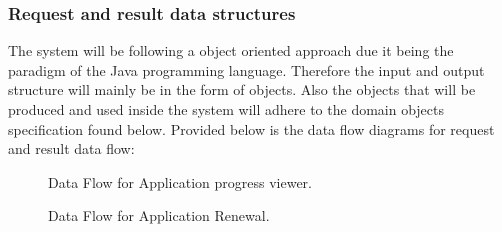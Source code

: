\documentclass[12pt]{article}
\begin{document}
\subsubsection{Request and result data structures}
The system will be following a object oriented approach due it being the paradigm of the Java programming language. Therefore the input and output structure will mainly be in the form of objects. Also the objects that will be produced and used inside the system will adhere to the domain objects specification found below. Provided below is the data flow diagrams for request and result data flow:

\begin{figure}[H]
\centering	
{}
\caption{Data Flow for Application progress viewer.}
\end{figure}

\begin{figure}[H]
\centering	
{}
\caption{Data Flow for Application Renewal.}
\end{figure}
\end{document}
